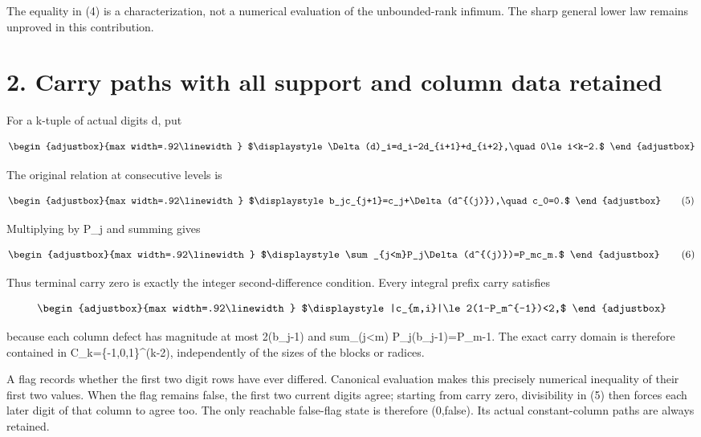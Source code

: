 The equality in (4) is a characterization, not a numerical evaluation of the unbounded-rank infimum. The sharp general lower law remains unproved in this contribution.

\section{2. Carry paths with all support and column data retained}\label{n07-carry-paths-with-all-support-and-column-data-retained}

For a k-tuple of actual digits d, put

\[
\begin{adjustbox}{max width=.92\linewidth}
$\displaystyle \Delta(d)_i=d_i-2d_{i+1}+d_{i+2},\quad 0\le i<k-2.$
\end{adjustbox}
\]

The original relation at consecutive levels is

\[
\begin{adjustbox}{max width=.92\linewidth}
$\displaystyle b_jc_{j+1}=c_j+\Delta(d^{(j)}),\quad c_0=0.$
\end{adjustbox}
\tag{5}
\]

Multiplying by P\_j and summing gives

\[
\begin{adjustbox}{max width=.92\linewidth}
$\displaystyle \sum_{j<m}P_j\Delta(d^{(j)})=P_mc_m.$
\end{adjustbox}
\tag{6}
\]

Thus terminal carry zero is exactly the integer second-difference condition. Every integral prefix carry satisfies

\[
\begin{adjustbox}{max width=.92\linewidth}
$\displaystyle |c_{m,i}|\le2(1-P_m^{-1})<2,$
\end{adjustbox}
\]

because each column defect has magnitude at most 2(b\_j-1) and sum\_(j\textless m) P\_j(b\_j-1)=P\_m-1. The exact carry domain is therefore contained in C\_k=\{-1,0,1\}\^{}(k-2), independently of the sizes of the blocks or radices.

A flag records whether the first two digit rows have ever differed. Canonical evaluation makes this precisely numerical inequality of their first two values. When the flag remains false, the first two current digits agree; starting from carry zero, divisibility in (5) then forces each later digit of that column to agree too. The only reachable false-flag state is therefore (0,false). Its actual constant-column paths are always retained.

